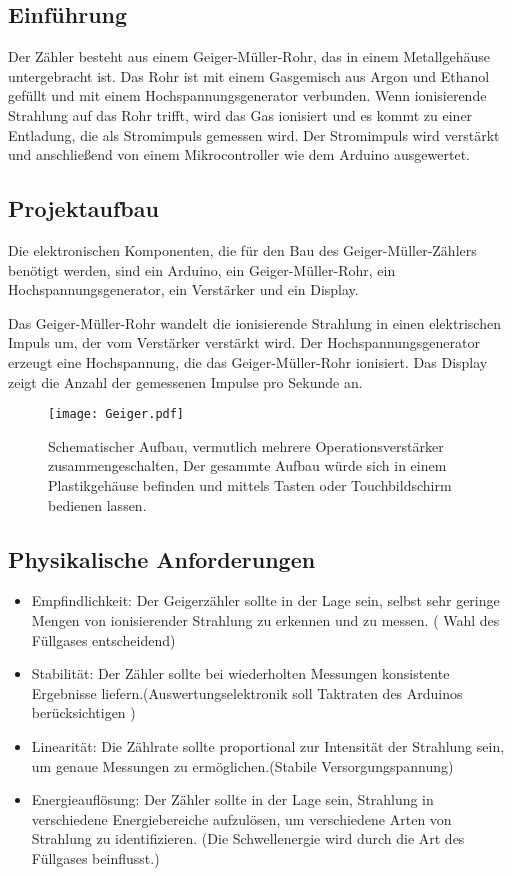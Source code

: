 \centering
\subsection*{Einführung}
Der Zähler besteht aus einem Geiger-Müller-Rohr, das in einem Metallgehäuse untergebracht ist. 
Das Rohr ist mit einem Gasgemisch aus Argon und Ethanol gefüllt und mit einem Hochspannungsgenerator verbunden. 
Wenn ionisierende Strahlung auf das Rohr trifft, wird das Gas ionisiert und es kommt zu einer Entladung, die als Stromimpuls gemessen wird. 
Der Stromimpuls wird verstärkt und anschließend von einem Mikrocontroller wie dem Arduino ausgewertet.
\subsection*{Projektaufbau}
Die elektronischen Komponenten, die für den Bau des Geiger-Müller-Zählers benötigt werden, sind ein Arduino, ein Geiger-Müller-Rohr, ein Hochspannungsgenerator, ein Verstärker und ein Display.

Das Geiger-Müller-Rohr wandelt die ionisierende Strahlung in einen elektrischen Impuls um, der vom Verstärker verstärkt wird. 
Der Hochspannungsgenerator erzeugt eine Hochspannung, die das Geiger-Müller-Rohr ionisiert. 
Das Display zeigt die Anzahl der gemessenen Impulse pro Sekunde an.

\begin{figure}[H]
    \centering
    \texttt{[image: Geiger.pdf]}
    \caption{Schematischer Aufbau, vermutlich mehrere Operationsverstärker zusammengeschalten, Der gesammte Aufbau würde sich in einem Plastikgehäuse befinden und mittels Tasten oder Touchbildschirm bedienen lassen.}
\end{figure}
\subsection*{Physikalische Anforderungen}
\begin{itemize}
    \item Empfindlichkeit: Der Geigerzähler sollte in der Lage sein, selbst sehr geringe Mengen von ionisierender Strahlung zu erkennen und zu messen. ( Wahl des Füllgases entscheidend)

    \item Stabilität: Der Zähler sollte bei wiederholten Messungen konsistente Ergebnisse liefern.(Auswertungselektronik soll Taktraten des Arduinos berücksichtigen )
    
    \item Linearität: Die Zählrate sollte proportional zur Intensität der Strahlung sein, um genaue Messungen zu ermöglichen.(Stabile Versorgungspannung)
    \item Energieauflösung: Der Zähler sollte in der Lage sein, Strahlung in verschiedene Energiebereiche aufzulösen, um verschiedene Arten von Strahlung zu identifizieren. (Die Schwellenergie wird durch die Art des Füllgases beinflusst.)
\end{itemize}

